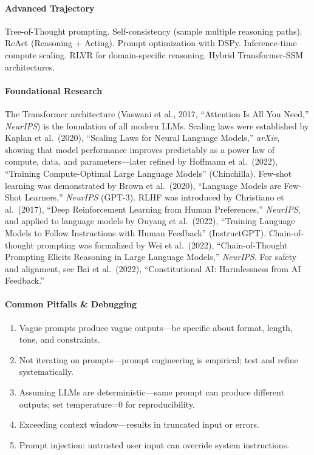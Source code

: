 \documentclass[11pt, a4paper, oneside]{report}
\begin{document}
\paragraph{Advanced Trajectory} Tree-of-Thought prompting. Self-consistency (sample multiple reasoning paths). ReAct (Reasoning + Acting). Prompt optimization with DSPy. Inference-time compute scaling. RLVR for domain-specific reasoning. Hybrid Transformer-SSM architectures.


\paragraph{Foundational Research} The Transformer architecture (Vaswani et al., 2017, ``Attention Is All You Need,'' \emph{NeurIPS}) is the foundation of all modern LLMs. Scaling laws were established by Kaplan et al.\ (2020), ``Scaling Laws for Neural Language Models,'' \emph{arXiv}, showing that model performance improves predictably as a power law of compute, data, and parameters---later refined by Hoffmann et al.\ (2022), ``Training Compute-Optimal Large Language Models'' (Chinchilla). Few-shot learning was demonstrated by Brown et al.\ (2020), ``Language Models are Few-Shot Learners,'' \emph{NeurIPS} (GPT-3). RLHF was introduced by Christiano et al.\ (2017), ``Deep Reinforcement Learning from Human Preferences,'' \emph{NeurIPS}, and applied to language models by Ouyang et al.\ (2022), ``Training Language Models to Follow Instructions with Human Feedback'' (InstructGPT). Chain-of-thought prompting was formalized by Wei et al.\ (2022), ``Chain-of-Thought Prompting Elicits Reasoning in Large Language Models,'' \emph{NeurIPS}. For safety and alignment, see Bai et al.\ (2022), ``Constitutional AI: Harmlessness from AI Feedback.''

\paragraph{Common Pitfalls \& Debugging}
\begin{enumerate}[leftmargin=*]
\item Vague prompts produce vague outputs---be specific about format, length, tone, and constraints.
\item Not iterating on prompts---prompt engineering is empirical; test and refine systematically.
\item Assuming LLMs are deterministic---same prompt can produce different outputs; set temperature=0 for reproducibility.
\item Exceeding context window---results in truncated input or errors.
\item Prompt injection: untrusted user input can override system instructions.
\end{enumerate}
\end{document}
